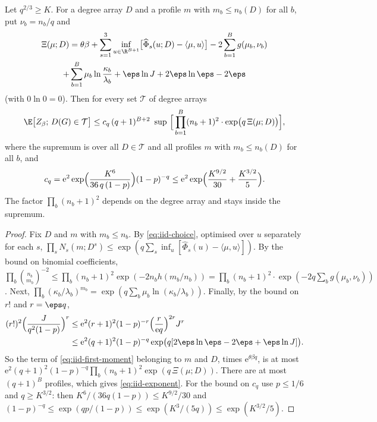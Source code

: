 \begin{lemma}\label{lem:iid-exponent}
Let $q^{2/3}\ge K$. For a degree array $D$ and a profile $m$ with $m_b\le n_b(D)$ for all
$b$, put $\nu_b=n_b/q$ and
\begin{multline}\label{eq:iid-Xi}
\Xi(\mu;D)=\theta\beta+\sum_{s=1}^3\inf_{u\in\R^{B+1}}
\bigl[\widehat\Phi_s(u;D)-\langle\mu,u\rangle\bigr]-2\sum_{b=1}^Bg(\mu_b,\nu_b)\\
+\sum_{b=1}^B\mu_b\ln\frac{\kappa_b}{\lambda_b}+\eps\ln J+2\eps\ln\eps-2\eps
\end{multline}
(with $0\ln0=0$). Then for every set $\mathcal{T}$ of degree arrays
\begin{equation}\label{eq:iid-exponent}
\E\bigl[Z_\beta;\,D(G)\in\mathcal{T}\bigr]\le c_q\,(q+1)^{B+2}\
\sup\ \Bigl[\,\prod_{b=1}^B(n_b+1)^2\cdot\exp\bigl(q\,\Xi(\mu;D)\bigr)\Bigr],
\end{equation}
where the supremum is over all $D\in\mathcal{T}$ and all profiles $m$ with $m_b\le n_b(D)$
for all $b$, and
\[
c_q=\mathrm{e}^2\exp\Bigl(\frac{K^6}{36\,q\,(1-p)}\Bigr)(1-p)^{-q}
\le\mathrm{e}^2\exp\Bigl(\frac{K^{9/2}}{30}+\frac{K^{3/2}}{5}\Bigr).
\]
The factor $\prod_b(n_b+1)^2$ depends on the degree array and stays inside the supremum.
\end{lemma}

\begin{proof}
Fix $D$ and $m$ with $m_b\le n_b$. By \eqref{eq:iid-choice}, optimised over $u$ separately
for each $s$,
$\prod_sN_s(m;D^s)\le\exp(q\sum_s\inf_u[\widehat\Phi_s(u)-\langle\mu,u\rangle])$. By the
bound on binomial coefficients,
$\prod_b\binom{n_b}{m_b}^{-2}\le\prod_b(n_b+1)^2\exp(-2n_bh(m_b/n_b))
=\prod_b(n_b+1)^2\cdot\exp(-2q\sum_bg(\mu_b,\nu_b))$. Next,
$\prod_b(\kappa_b/\lambda_b)^{m_b}=\exp(q\sum_b\mu_b\ln(\kappa_b/\lambda_b))$. Finally, by
the bound on $r!$ and $r=\eps q$,
\begin{align*}
(r!)^2\Bigl(\frac{J}{q^2(1-p)}\Bigr)^r
&\le\mathrm{e}^2(r+1)^2(1-p)^{-r}\Bigl(\frac{r}{\mathrm{e}q}\Bigr)^{2r}J^r\\
&\le\mathrm{e}^2(q+1)^2(1-p)^{-q}\exp\bigl(q[2\eps\ln\eps-2\eps+\eps\ln J]\bigr).
\end{align*}
So the term of \eqref{eq:iid-first-moment} belonging to $m$ and $D$, times
$\mathrm{e}^{\theta\beta q}$, is at most
$\mathrm{e}^2(q+1)^2(1-p)^{-q}\prod_b(n_b+1)^2\exp(q\,\Xi(\mu;D))$. There are at most
$(q+1)^B$ profiles, which gives \eqref{eq:iid-exponent}. For the bound on $c_q$ use
$p\le1/6$ and $q\ge K^{3/2}$: then $K^6/(36q(1-p))\le K^{9/2}/30$ and
$(1-p)^{-q}\le\exp(qp/(1-p))\le\exp(K^3/(5q))\le\exp(K^{3/2}/5)$.
\end{proof}

